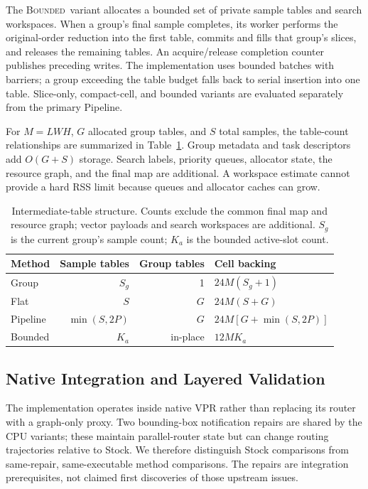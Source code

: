 \documentclass[conference,10pt,letterpaper]{IEEEtran}
\newcommand{\Bound}{\textsc{Bounded}}
\begin{document}
The \Bound\ variant allocates a bounded set of private sample tables and search workspaces. When a group's final sample completes, its worker performs the original-order reduction into the first table, commits and fills that group's slices, and releases the remaining tables. An acquire/release completion counter publishes preceding writes. The implementation uses bounded batches with barriers; a group exceeding the table budget falls back to serial insertion into one table. Slice-only, compact-cell, and bounded variants are evaluated separately from the primary Pipeline.

For $M=LWH$, $G$ allocated group tables, and $S$ total samples, the table-count relationships are summarized in Table~\ref{tab:storage}. Group metadata and task descriptors add $O(G+S)$ storage. Search labels, priority queues, allocator state, the resource graph, and the final map are additional. A workspace estimate cannot provide a hard RSS limit because queues and allocator caches can grow.

\begin{table}[t]
\centering\footnotesize
\caption{Intermediate-table structure. Counts exclude the common final map and resource graph; vector payloads and search workspaces are additional. $S_g$ is the current group's sample count; $K_a$ is the bounded active-slot count.}
\label{tab:storage}
\setlength{\tabcolsep}{3pt}
\begin{tabular}{lrrl}
\toprule
Method & Sample tables & Group tables & Cell backing \\
\midrule
Group & $S_g$ & 1 & $24M(S_g+1)$ \\
Flat & $S$ & $G$ & $24M(S+G)$ \\
Pipeline & $\min(S,2P)$ & $G$ & $24M[G+\min(S,2P)]$ \\
Bounded & $K_a$ & in-place & $12MK_a$ \\
\bottomrule
\end{tabular}
\end{table}

\subsection{Native Integration and Layered Validation}
The implementation operates inside native VPR rather than replacing its router with a graph-only proxy. Two bounding-box notification repairs are shared by the CPU variants; these maintain parallel-router state but can change routing trajectories relative to Stock. We therefore distinguish Stock comparisons from same-repair, same-executable method comparisons. The repairs are integration prerequisites, not claimed first discoveries of those upstream issues.
\end{document}
